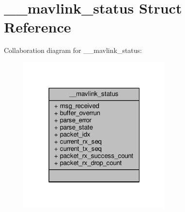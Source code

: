 \hypertarget{struct____mavlink__status}{\section{\+\_\+\+\_\+mavlink\+\_\+status Struct Reference}
\label{struct____mavlink__status}
}


Collaboration diagram for \+\_\+\+\_\+mavlink\+\_\+status\+:
\nopagebreak
\begin{figure}[H]
\begin{center}
\leavevmode
\includegraphics[width=220pt]{struct____mavlink__status__coll__graph}
\end{center}
\end{figure}
